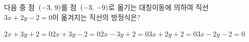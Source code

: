 다음 중 점~$(-3,\mkern3mu 9)$를 점~$(-3,\mkern3mu -9)$로 옮기는 대칭이동에 의하여 직선~$3x+2y-2=0$이 옮겨지는 직선의 방정식은?
\begin{choicesii}{$2x+3y+2=0$}{$2x+3y-2=0$}{$2x-3y+2=0$}{$3x+2y+2=0$}{$3x-2y-2=0$}\end{choicesii}
